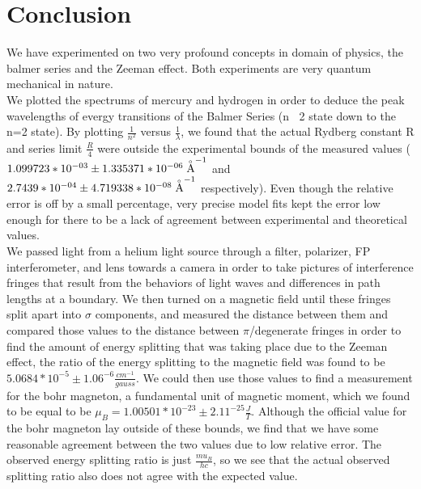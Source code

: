 \documentclass{article}
\begin{document}
\section{Conclusion}
    We have experimented on two very profound concepts in domain of physics, the balmer series and the Zeeman effect. Both experiments are very quantum mechanical in nature. \\\indent We plotted the spectrums of mercury and hydrogen in order to deduce the peak wavelengths of evergy transitions of the Balmer Series (n $\>$ 2 state down to the n=2 state). By plotting $\frac{1}{n^2}$ versus $\frac{1}{\lambda}$, we found that the actual Rydberg constant R and series limit $\frac{R}{4}$ were outside the experimental bounds of the measured values ($1.099723*10^{-03} \pm 1.335371*10^{-06} \buildrel _\circ \over {\mathrm{A}}^{-1}$ and $2.7439*10^{-04} \pm 4.719338*10^{-08} \buildrel _\circ \over {\mathrm{A}}^{-1}$ respectively). Even though the relative error is off by a small percentage, very precise model fits kept the error low enough for there to be a lack of agreement between experimental and theoretical values.
    \\\indent We passed light from a helium light source through a filter, polarizer, FP interferometer, and lens towards a camera in order to take pictures of interference fringes that result from the behaviors of light waves and differences in path lengths at a boundary. We then turned on a magnetic field until these fringes split apart into $\sigma$ components, and measured the distance between them and compared those values to the distance between $\pi$/degenerate fringes in order to find the amount of energy splitting that was taking place due to the Zeeman effect, the ratio of the energy splitting to the magnetic field was found to be $5.0684*10^{-5} \pm 1.06^{-6} \frac{cm^{-1}}{gauss}$. We could then use those values to find a measurement for the bohr magneton, a fundamental unit of magnetic moment, which we found to be equal to be $\mu_B = 1.00501*10^{-23} \pm 2.11^{-25} \frac{J}{T}$. Although the official value for the bohr magneton lay outside of these bounds, we find that we have some reasonable agreement between the two values due to low relative error. The observed energy splitting ratio is just $\frac{mu_B}{hc}$, so we see that the actual observed splitting ratio also does not agree with the expected value.
\end{document}
